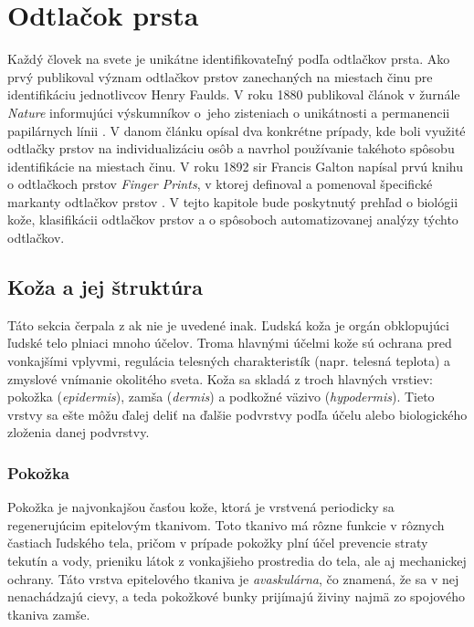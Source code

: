 \chapter{Odtlačok prsta} \label{kap:odtlacok}
  Každý človek na svete je unikátne identifikovateľný podľa odtlačkov prsta. Ako prvý publikoval význam odtlačkov prstov zanechaných na miestach činu
  pre identifikáciu jednotlivcov Henry Faulds. V roku 1880 publikoval článok v žurnále \emph{Nature} informujúci výskumníkov o~jeho zisteniach o unikátnosti
  a permanencii papilárnych línii \cite{FingerprintSrcBook}. V danom článku opísal dva konkrétne prípady, kde boli využité odtlačky prstov na individualizáciu
  osôb a navrhol používanie takéhoto spôsobu identifikácie na miestach činu. V roku 1892 sir Francis Galton napísal prvú knihu o odtlačkoch
  prstov \emph{Finger Prints}, v ktorej definoval a pomenoval špecifické markanty odtlačkov prstov \cite{FingerprintSrcBook}.
  V tejto kapitole bude poskytnutý prehľad o biológii kože, klasifikácii odtlačkov prstov a o spôsoboch automatizovanej analýzy týchto odtlačkov.

  \section{Koža a jej štruktúra}
  Táto sekcia čerpala z \cite{freinkel2001skin} ak nie je uvedené inak.
  Ľudská koža je orgán obklopujúci ľudské telo plniaci mnoho účelov. Troma hlavnými účelmi kože sú ochrana pred vonkajšími vplyvmi, regulácia
  telesných charakteristík (napr. telesná teplota) a zmyslové vnímanie okolitého sveta.
  Koža sa skladá z troch hlavných vrstiev: pokožka (\emph{epidermis}), zamša (\emph{dermis}) a podkožné väzivo (\emph{hypodermis}). Tieto vrstvy sa ešte môžu
  ďalej deliť na ďalšie podvrstvy podľa účelu alebo biologického zloženia danej podvrstvy.

  \subsection{Pokožka}
  Pokožka je najvonkajšou časťou kože, ktorá je vrstvená periodicky sa regenerujúcim epitelovým tkanivom. Toto tkanivo má rôzne funkcie v rôznych
  častiach ľudského tela, pričom v prípade pokožky plní účel prevencie straty tekutín a vody, prieniku látok z vonkajšieho prostredia do tela, ale aj
  mechanickej ochrany. Táto vrstva epitelového tkaniva je \emph{avaskulárna}, čo znamená, že sa v nej nenachádzajú cievy, a teda pokožkové bunky prijímajú živiny
  najmä zo spojového tkaniva zamše.
  
